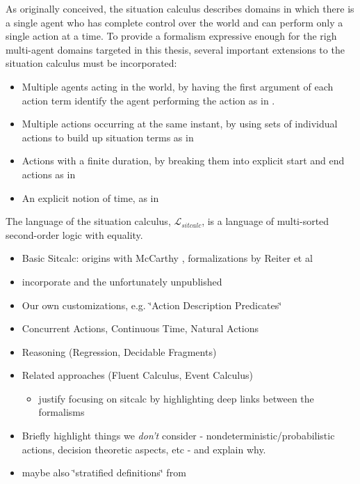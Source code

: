As originally conceived, the situation calculus describes domains
in which there is a single agent who has complete control over the
world and can perform only a single action at a time. To provide a
formalism expressive enough for the righ multi-agent domains targeted
in this thesis, several important extensions to the situation calculus
must be incorporated: 

\begin{itemize}
\item Multiple agents acting in the world, by having the first argument
of each action term identify the agent performing the action as in
\cite{shapiro98specifying_ma_systems,shapiro01casl_feat_inter}. 
\item Multiple actions occurring at the same instant, by using sets of individual
actions to build up situation terms as in \cite{lin92sc_conc,pinto94temporal,reiter96sc_nat_conc} 
\item Actions with a finite duration, by breaking them into explicit start
and end actions as in \cite{pinto94temporal} 
\item An explicit notion of time, as in \cite{pinto94temporal,reiter96sc_nat_conc} 
\end{itemize}
The language of the situation calculus, $\mathcal{L}_{sitcalc}$,
is a language of multi-sorted second-order logic with equality.

\begin{itemize}
\item Basic Sitcalc: origins with McCarthy \cite{McCHay69sitcalc}, formalizations
by Reiter et al \cite{reiter01kia,pirri99contributions_sitcalc,levesque98sc_foundations} 
\item incorporate \cite{pinto99ramification,pinto98interacting_effects}
and the unfortunately unpublished \cite{pinto00action_interaction} 
\item Our own customizations, e.g. \char`\"{}Action Description Predicates\char`\"{}
\cite{kelly07sc_persistence} 
\item Concurrent Actions, Continuous Time, Natural Actions \cite{pinto94temporal,reiter96sc_nat_conc} 
\item Reasoning (Regression, Decidable Fragments) 
\item Related approaches (Fluent Calculus, Event Calculus) 

\begin{itemize}
\item justify focusing on sitcalc by highlighting deep links between the
formalisms 
\end{itemize}
\item Briefly highlight things we \emph{don't} consider - nondeterministic/probabilistic
actions, decision theoretic aspects, etc - and explain why. 
\item maybe also \char`\"{}stratified definitions\char`\"{} from \cite{pinto94temporal} 
\end{itemize}

